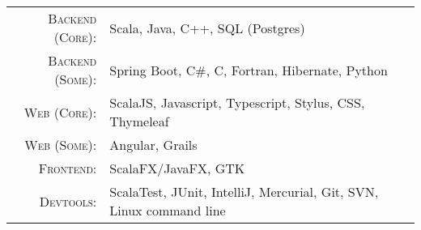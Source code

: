 %
%
%

\renewcommand{\arraystretch}{1.1}

	\begin{tabular}{>{}r>{}p{13cm}} 
		\textsc{Backend (Core):}  		&   Scala, Java, C++, SQL (Postgres)\\ 
		\textsc{Backend (Some):}  		&   Spring Boot, C\#, C, Fortran, Hibernate, Python\\ 
		\textsc{Web (Core):}               	&   ScalaJS, Javascript, Typescript, Stylus, CSS, Thymeleaf\\ 
		\textsc{Web (Some):}               	&   Angular, Grails\\ 
		\textsc{Frontend:}               	&   ScalaFX/JavaFX, GTK\\ 
		\textsc{Devtools:}	  		&   ScalaTest, JUnit, IntelliJ, Mercurial, Git, SVN, Linux command line
	\end{tabular}